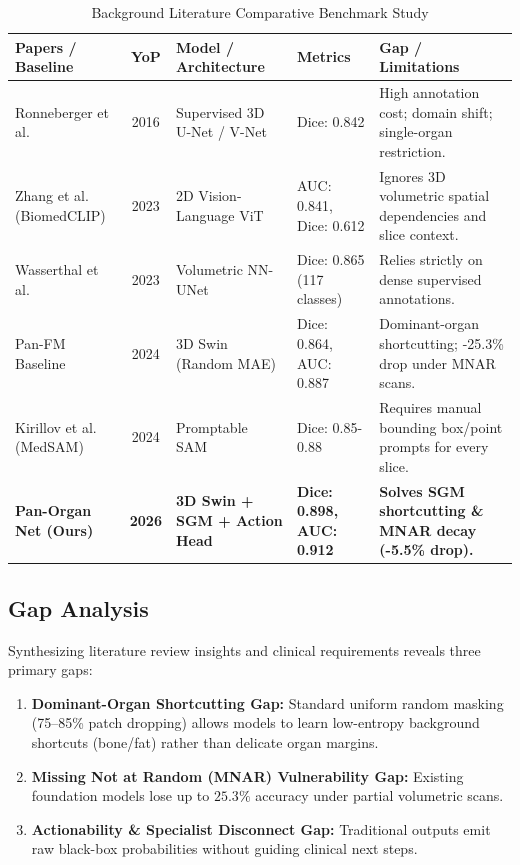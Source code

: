 \documentclass[11pt,a4paper]{article}
\begin{document}
\begin{table}[h!]
\centering
\small
\renewcommand{\arraystretch}{1.2}
\begin{tabularx}{\textwidth}{|X|c|X|X|X|}
\hline
\textbf{Papers / Baseline} & \textbf{YoP} & \textbf{Model / Architecture} & \textbf{Metrics} & \textbf{Gap / Limitations} \\ \hline
Ronneberger et al. & 2016 & Supervised 3D U-Net / V-Net & Dice: 0.842 & High annotation cost; domain shift; single-organ restriction. \\ \hline
Zhang et al. (BiomedCLIP) & 2023 & 2D Vision-Language ViT & AUC: 0.841, Dice: 0.612 & Ignores 3D volumetric spatial dependencies and slice context. \\ \hline
Wasserthal et al. & 2023 & Volumetric NN-UNet & Dice: 0.865 (117 classes) & Relies strictly on dense supervised annotations. \\ \hline
Pan-FM Baseline & 2024 & 3D Swin (Random MAE) & Dice: 0.864, AUC: 0.887 & Dominant-organ shortcutting; -25.3\% drop under MNAR scans. \\ \hline
Kirillov et al. (MedSAM) & 2024 & Promptable SAM & Dice: 0.85-0.88 & Requires manual bounding box/point prompts for every slice. \\ \hline
\textbf{Pan-Organ Net (Ours)} & \textbf{2026} & \textbf{3D Swin + SGM + Action Head} & \textbf{Dice: 0.898, AUC: 0.912} & \textbf{Solves SGM shortcutting \& MNAR decay (-5.5\% drop).} \\ \hline
\end{tabularx}
\caption{Background Literature Comparative Benchmark Study}
\end{table}

\subsection{Gap Analysis}
Synthesizing literature review insights and clinical requirements reveals three primary gaps:
\begin{enumerate}
    \item \textbf{Dominant-Organ Shortcutting Gap:} Standard uniform random masking (75--85\% patch dropping) allows models to learn low-entropy background shortcuts (bone/fat) rather than delicate organ margins.
    \item \textbf{Missing Not at Random (MNAR) Vulnerability Gap:} Existing foundation models lose up to $25.3\%$ accuracy under partial volumetric scans.
    \item \textbf{Actionability \& Specialist Disconnect Gap:} Traditional outputs emit raw black-box probabilities without guiding clinical next steps.
\end{enumerate}
\end{document}
